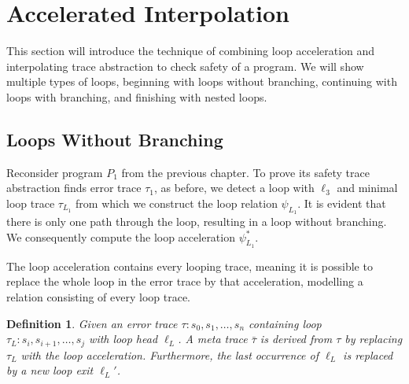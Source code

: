 \documentclass{article}
\newtheorem{mydef}{Definition}
\newcommand\mycom[1]{}
\newcommand\mycom[1]{#1}
\newcommand{\dd}[1]{\mycom{\todo[color=orange!40,inline]{\small DD: #1}}}
\newcommand{\ts}[1]{\mycom{\todo[color=green!40,inline]{\small TS: #1}}}
\begin{document}
\section{Accelerated Interpolation}\label{sec:accelinterpol}
This section will introduce the technique of combining loop acceleration and interpolating trace abstraction to check safety of a program. 
We will show multiple types of loops, beginning with loops without branching, continuing with loops with branching, and finishing with nested loops.

\subsection{Loops Without Branching}
Reconsider program $P_1$ from the previous chapter. 
To prove its safety trace abstraction finds error trace $\tau_1$, as before, we detect a loop with $\ell_3$ and minimal loop trace $\tau_{L_1}$ from which we construct the loop relation $\psi_{L_1}$. 
It is evident that there is only one path through the loop, resulting in a loop without branching. 
We consequently compute the loop acceleration $\psi^*_{L_1}$.

The loop acceleration contains every looping trace, meaning it is possible to replace the whole loop in the error trace by that acceleration, modelling a relation consisting of every loop trace.
\dd{Why not explain the idea of meta trace first and then give a definition?}

\begin{mydef}
    Given an error trace $\tau: s_0, s_1, \ldots, s_n$ containing loop $\tau_L: s_i, s_{i+1}, \ldots, s_j$ with loop head $\ell_L$. 
    A meta trace $\bar{\tau}$ is derived from $\tau$ by replacing $\tau_L$ with the loop acceleration. 
    Furthermore, the last occurrence of $\ell_L$ is replaced by a new loop exit $\ell_L'$.
\end{mydef}
\ts{Now you have a mixture of statements and relations. Do you want to allow this (explanation required) or use transformulas in general?}
\dd{Which loop acceleration? Will you talk about properties of loop accelerations? What is a loop acceleration? Is it "the closure"? Or is it \emph{some} relation over program states that has some properties relative to a closure?}
\end{document}
